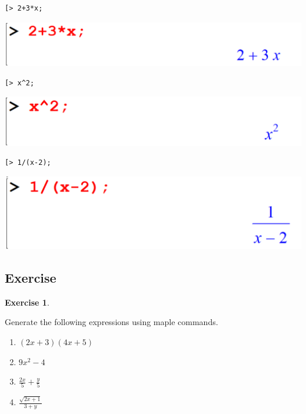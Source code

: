 \documentclass[
]{book}
\providecommand{\tightlist}{%
  \setlength{\itemsep}{0pt}\setlength{\parskip}{0pt}}
\theoremstyle{definition}
\theoremstyle{definition}
\theoremstyle{definition}
\newtheorem{exercise}{Exercise}[chapter]
\theoremstyle{definition}
\theoremstyle{remark}
\begin{document}
\begin{verbatim}
[> 2+3*x;
\end{verbatim}

\includegraphics{figures/Lesson 1/fig51.png}

\begin{verbatim}
[> x^2;
\end{verbatim}

\includegraphics{figures/Lesson 1/fig52.png}

\begin{verbatim}
[> 1/(x-2);
\end{verbatim}

\includegraphics{figures/Lesson 1/fig53.png}

\subsection{Exercise}\label{exercise-2}

\begin{exercise}
\protect\hypertarget{exr:unnamed-chunk-13}{}\label{exr:unnamed-chunk-13}

Generate the following expressions using maple commands.

\begin{enumerate}
\def\labelenumi{\roman{enumi})}
\tightlist
\item
  \((2x + 3)(4x + 5)\)
\item
  \(9x^2 − 4\)
\item
  \(\frac{2x}{5}+\frac{y}{5}\)
\item
  \(\frac{\sqrt{2x+1}}{3+y}\)
\end{enumerate}

\end{exercise}
\end{document}
